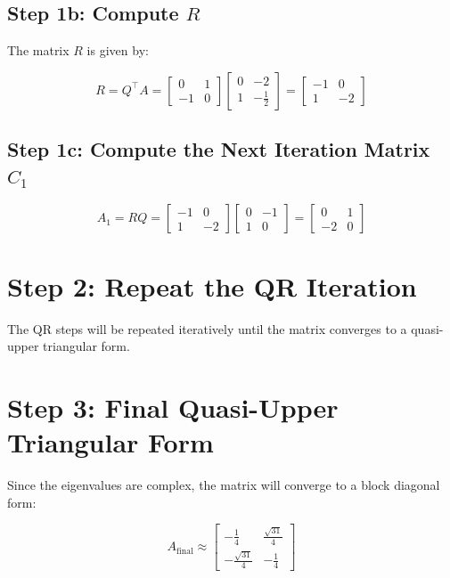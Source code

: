 \documentclass[journal]{IEEEtran}
\begin{document}
\subsection*{Step 1b: Compute $R$}
The matrix $R$ is given by:

\[
R = Q^\top A = \begin{bmatrix}
0 & 1 \\
-1 & 0
\end{bmatrix}
\begin{bmatrix}
0 & -2 \\
1 & -\frac{1}{2}
\end{bmatrix}
=
\begin{bmatrix}
-1 & 0 \\
1 & -2
\end{bmatrix}
\]

\subsection*{Step 1c: Compute the Next Iteration Matrix $C_1$}
\[
A_1 = RQ = \begin{bmatrix}
-1 & 0 \\
1 & -2
\end{bmatrix}
\begin{bmatrix}
0 & -1 \\
1 & 0
\end{bmatrix}
=
\begin{bmatrix}
0 & 1 \\
-2 & 0
\end{bmatrix}
\]

\section*{Step 2: Repeat the QR Iteration}
The QR steps will be repeated iteratively until the matrix converges to a quasi-upper triangular form.

\section*{Step 3: Final Quasi-Upper Triangular Form}
Since the eigenvalues are complex, the matrix will converge to a block diagonal form:

\[
A_{\text{final}} \approx \begin{bmatrix}
-\frac{1}{4} & \frac{\sqrt{31}}{4} \\
-\frac{\sqrt{31}}{4} & -\frac{1}{4}
\end{bmatrix}
\]
\end{document}

